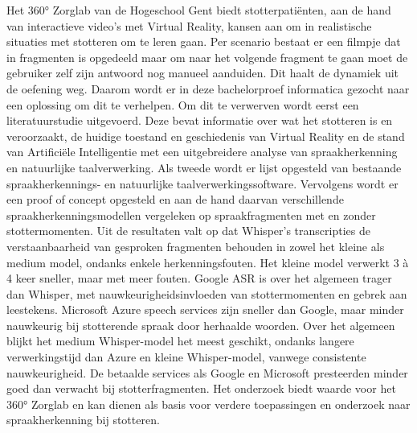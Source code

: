 Het 360° Zorglab van de Hogeschool Gent biedt stotterpatiënten, aan de hand van interactieve video's met Virtual Reality, kansen aan om in realistische situaties met stotteren om te leren gaan. Per scenario bestaat er een filmpje dat in fragmenten is opgedeeld maar om naar het volgende fragment te gaan moet de gebruiker zelf zijn antwoord nog manueel aanduiden. Dit haalt de dynamiek uit de oefening weg. Daarom wordt er in deze bachelorproef informatica gezocht naar een oplossing om dit te verhelpen. Om dit te verwerven wordt eerst een literatuurstudie uitgevoerd. Deze bevat informatie over wat het stotteren is en veroorzaakt, de huidige toestand en geschiedenis van Virtual Reality en de stand van Artificiële Intelligentie met een uitgebreidere analyse van spraakherkenning en natuurlijke taalverwerking. Als tweede wordt er lijst opgesteld van bestaande spraakherkennings- en natuurlijke taalverwerkingssoftware. Vervolgens wordt er een proof of concept opgesteld en aan de hand daarvan verschillende spraakherkenningsmodellen vergeleken op spraakfragmenten met en zonder stottermomenten. Uit de resultaten valt op dat Whisper's transcripties de verstaanbaarheid van gesproken fragmenten behouden in zowel het kleine als medium model, ondanks enkele herkenningsfouten. Het kleine model verwerkt 3 à 4 keer sneller, maar met meer fouten. Google ASR is over het algemeen trager dan Whisper, met nauwkeurigheidsinvloeden van stottermomenten en gebrek aan leestekens. Microsoft Azure speech services zijn sneller dan Google, maar minder nauwkeurig bij stotterende spraak door herhaalde woorden. Over het algemeen blijkt het medium Whisper-model het meest geschikt, ondanks langere verwerkingstijd dan Azure en kleine Whisper-model, vanwege consistente nauwkeurigheid. De betaalde services als Google en Microsoft presteerden minder goed dan verwacht bij stotterfragmenten. Het onderzoek biedt waarde voor het 360° Zorglab en kan dienen als basis voor verdere toepassingen en onderzoek naar spraakherkenning bij stotteren.








